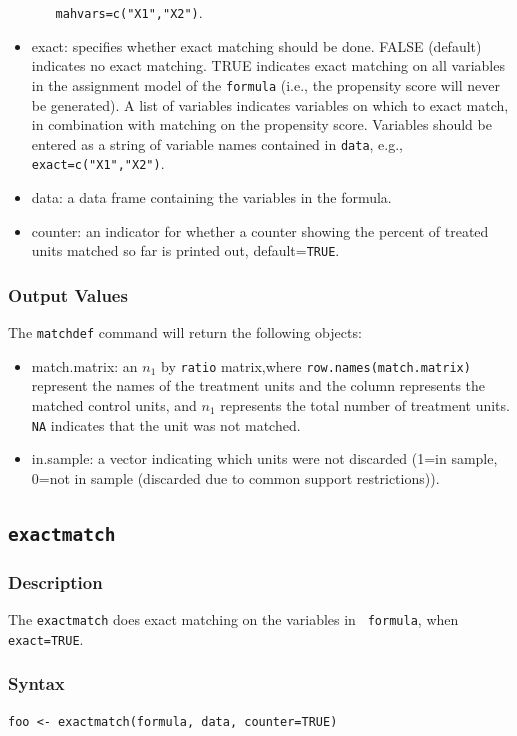 \documentclass[oneside,letterpaper,titlepage]{article}
\begin{document}
\begin{appendix}
\begin{itemize}
\begin{itemize}
    \texttt{mahvars=c("X1","X2")}.
  \end{itemize}
\item{exact}: specifies whether exact matching should be done.  FALSE
  (default) indicates no exact matching.  TRUE indicates exact
  matching on all variables in the assignment model of the
  \texttt{formula} (i.e., the propensity score will never be
  generated).  A list of variables indicates variables on which to
  exact match, in combination with matching on the propensity score.
  Variables should be entered as a string of variable names contained
  in \texttt{data}, e.g., \texttt{exact=c("X1","X2")}.
\item{data}: a data frame containing the variables in the formula.
\item{counter}: an indicator for whether a counter showing the percent
  of treated units matched so far is printed out, default={\tt TRUE}.
\end{itemize}


\subsubsection{Output Values}
The \texttt{matchdef} command will return the following objects:

\begin{itemize}
\item{match.matrix}: an $n_1$ by \texttt{ratio} matrix,where
  \texttt{row.names(match.matrix)} represent the names of the
  treatment units and the column represents the matched control units,
  and $n_1$ represents the total number of treatment units.
  \texttt{NA} indicates that the unit was not matched.
\item{in.sample}: a vector indicating which units were not discarded
  (1=in sample, 0=not in sample (discarded due to common support
  restrictions)).
\end{itemize}

\subsection{\texttt{exactmatch}}

\subsubsection{Description}
The \texttt{exactmatch} does exact matching on the variables in {\tt
  formula}, when {\tt exact=TRUE}.

\subsubsection{Syntax}
\begin{verbatim}
foo <- exactmatch(formula, data, counter=TRUE)
\end{verbatim} 


\end{appendix}
\end{document}
